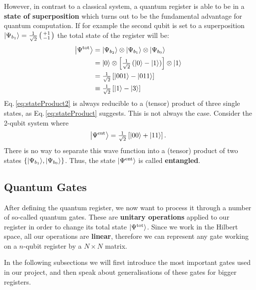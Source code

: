 \documentclass[bibliography=totocnumbered, 10pt]{article}
\theoremstyle{NoticeStyle}
\begin{document}
However, in contrast to a classical system, a quantum register is able to be in a \textbf{state of superposition} which turns out to be the fundamental advantage for quantum computation. If for example the second qubit is set to a superposition ${\left\vert{\Psi_{b_1}}\right\rangle}=\tfrac{1}{\sqrt{2}}\left(\begin{smallmatrix}
+1\\-1
\end{smallmatrix}\right)$ the total state of the register will be:
%
\begin{align}
	{\left\vert{\Psi^\text{tot}}\right\rangle} &= {\left\vert{\Psi_{b_2}}\right\rangle} \otimes {\left\vert{\Psi_{b_1}}\right\rangle} \otimes {\left\vert{\Psi_{b_0}}\right\rangle}\label{eq:stateProduct}\\
			   &= {\left\vert{0}\right\rangle} \otimes \left[ \tfrac{1}{\sqrt{2}} \left({\left\vert{0}\right\rangle} - {\left\vert{1}\right\rangle}\right) \right] \otimes {\left\vert{1}\right\rangle}\\
			   &= \tfrac{1}{\sqrt{2}} \left[ {\left\vert{001}\right\rangle} - {\left\vert{011}\right\rangle}   \right]\\
			   &\equiv \tfrac{1}{\sqrt{2}} \left[ {\left\vert{1}\right\rangle} - {\left\vert{3}\right\rangle}   \right]\label{eq:stateProduct2}
\end{align} 
%
Eq.\,\ref{eq:stateProduct2} is always reducible to a (tensor) product of three single states, as Eq.\,\ref{eq:stateProduct} suggests. This is not always the case. Consider the 2-qubit system where
%
\begin{align}
	{\left\vert{\Psi^\text{ent}}\right\rangle} = \tfrac{1}{\sqrt{2}}  \left[ {\left\vert{00}\right\rangle} + {\left\vert{11}\right\rangle} \right].
\end{align}
%
There is no way to separate this wave function into a (tensor) product of two states
$\{ {\left\vert{\Psi_{b_1}}\right\rangle}, {\left\vert{\Psi_{b_0}}\right\rangle} \}$. Thus, the state ${\left\vert{\Psi^\text{ent}}\right\rangle}$ is called \textbf{entangled}.

\subsection{Quantum Gates}\label{sec:Quantum gates}
After defining the quantum register, we now want to process it through a number of so-called quantum gates. These are \textbf{unitary operations} applied to our register in order to change its total state ${\left\vert{\Psi^\text{tot}}\right\rangle}$. Since we work in the Hilbert space, all our operations are \textbf{linear}, therefore we can represent any gate working on a $n$-qubit register by a $N \times N$ matrix.

In the following subsections we will first introduce the most important gates used in our project, and then speak about generalisations of these gates for bigger registers.
\end{document}
